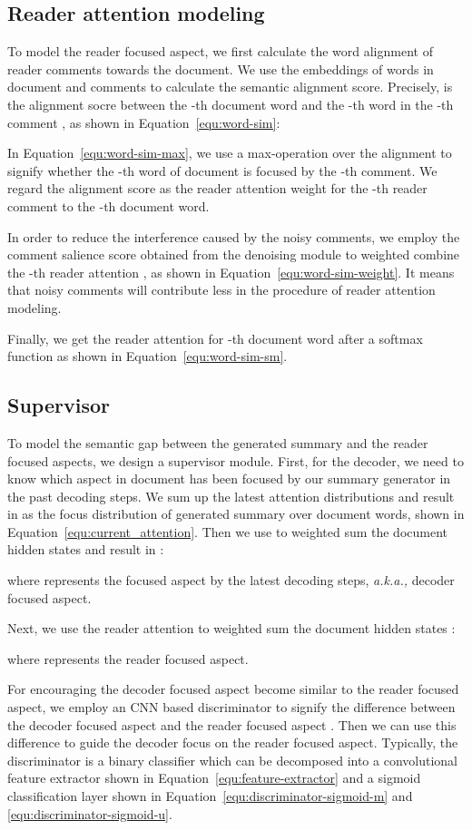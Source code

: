 \documentclass[letterpaper]{article} \usepackage{aaai19}  \usepackage{times}  \usepackage{helvet}  \usepackage{courier}
\newcommand{\aka}{\emph{a.k.a.,}\xspace}
\begin{document}
\subsection{Reader attention modeling}
To model the reader focused aspect, we first calculate the word alignment of reader comments towards the document.
We use the embeddings of words in document and comments to calculate the semantic alignment score. Precisely,  is the alignment socre between the -th document word  and the -th word in the -th comment , as shown in Equation~\ref{equ:word-sim}:

In Equation~\ref{equ:word-sim-max}, we use a max-operation over the alignment  to signify whether the -th word of document is focused by the -th comment.
We regard the alignment score  as the reader attention weight for the -th reader comment to the -th document word.

In order to reduce the interference caused by the noisy comments, we employ the comment salience score  obtained from the denoising module to weighted combine the -th reader attention , as shown in Equation~\ref{equ:word-sim-weight}. It means that noisy comments will contribute less in the procedure of reader attention modeling.

Finally, we get the reader attention  for -th document word after a softmax function as shown in Equation~\ref{equ:word-sim-sm}.

\subsection{Supervisor} \label{sec:supervisor}

To model the semantic gap between the generated summary and the reader focused aspects, we design a supervisor module.
First, for the decoder, we need to know which aspect in document has been focused by our summary generator in the past decoding steps.
We sum up the latest  attention distributions  and result in  as the focus distribution of generated summary over  document words, shown in Equation~\ref{equ:current_attention}.
Then we use  to weighted sum the document hidden states  and result in :

where  represents the focused aspect by the latest  decoding steps, \aka decoder focused aspect.

Next, we use the reader attention  to weighted sum the document hidden states :

where  represents the reader focused aspect.

For encouraging the decoder focused aspect become similar to the reader focused aspect, we employ an CNN based discriminator to signify the difference between the decoder focused aspect  and the reader focused aspect .
Then we can use this difference to guide the decoder focus on the reader focused aspect.
Typically, the discriminator is a binary classifier which can be decomposed into a convolutional feature extractor  shown in Equation~\ref{equ:feature-extractor} and a sigmoid classification layer shown in Equation~\ref{equ:discriminator-sigmoid-m} and \ref{equ:discriminator-sigmoid-u}. 
\end{document}
